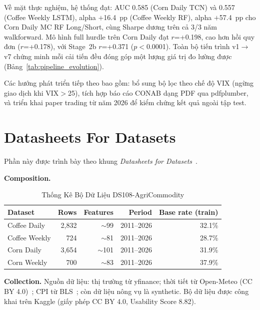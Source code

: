 \documentclass[conference]{IEEEtran}
\begin{document}
Về mặt thực nghiệm, hệ thống đạt: AUC 0.585 (Corn Daily TCN) và 0.557 (Coffee
Weekly LSTM), alpha $+$16.4~pp (Coffee Weekly RF), alpha $+$57.4~pp cho Corn
Daily MC RF Long/Short, cùng Sharpe dương trên cả 3/3 năm walkforward. Mô hình
full hurdle trên Corn Daily đạt $r$=+0.198, cao hơn hồi quy đơn ($r$=+0.178),
với Stage~2b $r$=+0.371 ($p<$0.0001). Toàn bộ tiến trình v1$\to$v7 chứng minh
mỗi cải tiến đều đóng góp một lượng giá trị đo lường được
(Bảng~\ref{tab:pipeline_evolution}).

Các hướng phát triển tiếp theo bao gồm: bổ sung bộ lọc theo chế độ VIX (ngừng
giao dịch khi VIX$>$25), tích hợp báo cáo CONAB dạng PDF qua pdfplumber, và
triển khai paper trading từ năm 2026 để kiểm chứng kết quả ngoài tập test.

\section*{Datasheets For Datasets}

Phần này được trình bày theo khung \textit{Datasheets for Datasets}~\cite{gebru2021}.

\textbf{Composition.}
\begin{table}[h]
\caption{Thống Kê Bộ Dữ Liệu DS108-AgriCommodity}
\label{tab:dataset_stats}
\centering
\begin{tabular}{@{}lrrrr@{}}
\toprule
\textbf{Dataset} & \textbf{Rows} & \textbf{Features} & \textbf{Period} & \textbf{Base rate (train)} \\
\midrule
Coffee Daily  & 2,832 & $\sim$99 & 2011--2026 & 32.1\% \\
Coffee Weekly & 724   & $\sim$81 & 2011--2026 & 28.7\% \\
Corn Daily    & 3,654 & $\sim$101 & 2011--2026 & 31.9\% \\
Corn Weekly   & 700   & $\sim$83 & 2011--2026 & 37.9\% \\
\bottomrule
\end{tabular}
\end{table}

\textbf{Collection.} Nguồn dữ liệu: thị trường từ yfinance; thời tiết từ
Open-Meteo (CC BY 4.0)~\cite{zippenfenig2023}; CPI từ BLS~\cite{bls2026}; còn
dữ liệu nông vụ là synthetic. Bộ dữ liệu được công khai trên Kaggle (giấy
phép CC BY 4.0, Usability Score 8.82).
\end{document}
